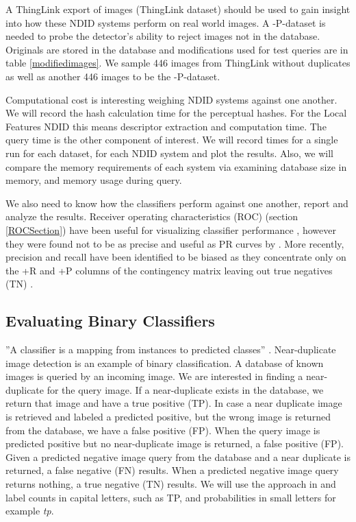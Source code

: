 \documentclass[english,12pt,a4paper,pdftex,elec,utf8, table]{aaltothesis}
\begin{document}
A ThingLink export of images (ThingLink dataset) should be used to gain insight into how these NDID systems perform on real world images. A -P-dataset is needed to probe the detector's ability to reject images not in the database. Originals are stored in the database and modifications used for test queries are in table \ref{modifiedimages}. We sample 446 images from ThingLink without duplicates as well as another 446 images to be the -P-dataset.

Computational cost is interesting weighing NDID systems against one another. We will record the hash calculation time for the perceptual hashes. For the Local Features NDID this means descriptor extraction and computation time. The query time is the other component of interest. We will record times for a single run for each dataset, for each NDID system and plot the results. Also, we will compare the memory requirements of each system via examining database size in memory, and memory usage during query.

We also need to know how the classifiers perform against one another, report and analyze the results. Receiver operating characteristics (ROC) (section \ref{ROCSection}) have been useful for visualizing classifier performance \cite{Fawcett2006}, however they were found not to be as precise and useful as PR curves by \cite{Davis2006}. More recently, precision and recall have been identified to be biased as they concentrate only on the +R and +P columns of the contingency matrix leaving out true negatives (TN) \cite{POWERS2011}.

\subsection{Evaluating Binary Classifiers}
''A classifier is a mapping from instances to predicted classes'' \cite{Fawcett2006}. Near-duplicate image detection is an example of binary classification. A database of known images is queried by an incoming image. We are interested in finding a near-duplicate for the query image. If a near-duplicate exists in the database, we return that image and have a true positive (TP). In case a near duplicate image is retrieved and labeled a predicted positive, but the wrong image is returned from the database, we have a false positive (FP). When the query image is predicted positive but no near-duplicate image is returned, a false positive (FP). Given a predicted negative image query from the database and a near duplicate is returned, a false negative (FN) results. When a predicted negative image query returns nothing, a true negative (TN) results. We will use the approach in \cite{POWERS2011} and label counts in capital letters, such as TP, and probabilities in small letters for example \emph{tp}.
\end{document}
